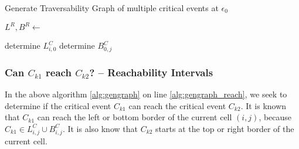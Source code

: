 \begin{algorithm}[H]
\caption{Generate Traversability Graph of multiple critical events at $\epsilon_0$}\label{alg:gengraph}
\begin{algorithmic}[1]

	\State{}
	

	
	\State $L^R, B^R \gets$ 

	\EndFor

	 {determine $L_{i, 0}^C$} \EndFor
	 {determine $B_{0,j}^C$} \EndFor
	 
			
					
					 \label{alg:gengraph_reach}
					\EndIf
					
				\EndFor
			\EndFor
			
		
		\EndFor
	\EndFor
	

\EndFunction

\end{algorithmic}
\end{algorithm}

\subsubsection{Can $C_{k1}$ reach $C_{k2}$? – Reachability Intervals}

In the above algorithm \ref{alg:gengraph} on line \ref{alg:gengraph_reach}, we seek to determine if the critical event $C_{k1}$ can reach the critical event $C_{k2}$. It is known that $C_{k1}$ can reach the left or bottom border of the current cell $(i, j)$, because $C_{k1} \in L_{i, j}^C \cup B_{i, j}^C$. It is also know that $C_{k2}$ starts at the top or right border of the current cell.

